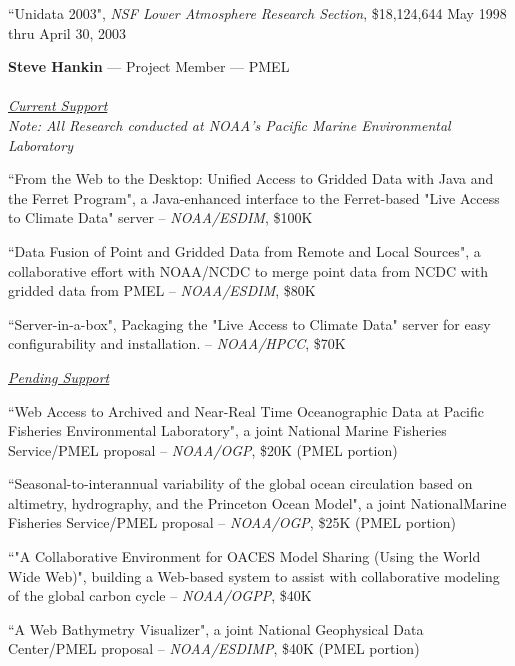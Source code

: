 \documentclass[12pt]{article}
\begin{document}
\Hpar ``Unidata 2003", {\em NSF Lower Atmosphere Research Section}, 
\$18,124,644 May 1998 thru April 30, 2003

\bigskip

\begin{center}
{\large {\bf Steve Hankin} --- Project Member --- PMEL\\
\ \\
\vspace{.08in} \underline {\it Current Support}}\\
\vspace{.08in} {\small \it Note: All Research conducted at NOAA's Pacific Marine Environmental Laboratory}\\
\end{center}
\Hpar ``From the Web to the Desktop: Unified Access to Gridded Data with Java
and the Ferret Program", a Java-enhanced interface to the Ferret-based "Live
Access to Climate Data" server -- {\em NOAA/ESDIM}, \$100K

\Hpar ``Data Fusion of Point and Gridded Data from Remote and Local Sources", a
collaborative effort with NOAA/NCDC to merge point data from NCDC with
gridded data from PMEL -- {\em NOAA/ESDIM}, \$80K

\Hpar ``Server-in-a-box", Packaging the "Live Access to Climate Data" server for
easy configurability and installation.  -- {\em NOAA/HPCC}, \$70K

\begin{center}
{\large \underline{\it Pending Support}}\\
\end{center}

\Hpar ``Web Access to Archived and Near-Real Time Oceanographic Data at Pacific
Fisheries Environmental Laboratory", a joint National Marine Fisheries
Service/PMEL proposal -- {\em NOAA/OGP}, \$20K (PMEL portion)

\Hpar ``Seasonal-to-interannual variability of the global ocean circulation
based on altimetry, hydrography, and the Princeton Ocean Model", a joint NationalMarine Fisheries Service/PMEL proposal -- {\em NOAA/OGP}, \$25K (PMEL portion)

\Hpar ``"A Collaborative Environment for OACES Model Sharing (Using the World Wide
Web)", building a Web-based system to assist with collaborative modeling of
the global carbon cycle -- {\em NOAA/OGPP}, \$40K

\Hpar ``A Web Bathymetry Visualizer", a joint National Geophysical Data
Center/PMEL proposal -- {\em NOAA/ESDIMP}, \$40K (PMEL portion)
\end{document}
